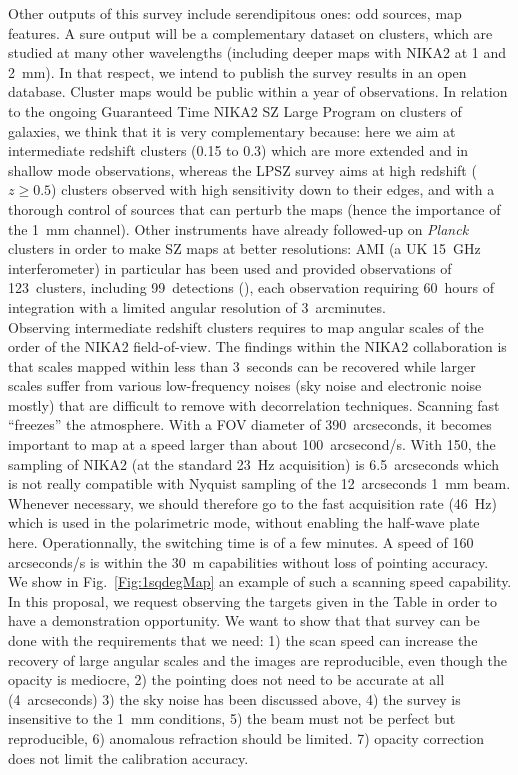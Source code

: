 \documentclass[11pt,a4paper,twoside,graphicx,color]{article}
\begin{document}
Other outputs of this survey include serendipitous ones: odd sources,
map features. A sure output will be a complementary dataset on
clusters, which are studied at many other wavelengths (including
deeper maps with NIKA2 at 1 and 2~mm). In that respect, we intend to
publish the survey results in an open database. Cluster maps would be
public within a year of observations. In relation to the ongoing
Guaranteed Time NIKA2 SZ Large Program on clusters of galaxies, we
think that it is very complementary because: here we aim at
intermediate redshift clusters (0.15 to 0.3) which are more extended
and in shallow mode observations, whereas the LPSZ survey aims at high
redshift ($z\ge 0.5$) clusters observed with high sensitivity down to
their edges, and with a thorough control of sources that can perturb
the maps (hence the importance of the 1~mm channel). Other instruments
have already followed-up on {\sl Planck} clusters in order to make SZ
maps at better resolutions: AMI (a UK 15~GHz interferometer) in
particular has been used and provided observations of 123~clusters,
including 99~detections (\cite{Perrott2015}), each observation
requiring 60~hours of integration with a limited angular resolution of
3~arcminutes.\\

\vspace{-0.1cm}  Observing intermediate redshift clusters requires to map
angular scales of the order of the NIKA2 field-of-view. The findings
within the NIKA2 collaboration is that scales mapped within less than
3~seconds can be recovered while larger scales suffer from various
low-frequency noises (sky noise and electronic noise mostly) that are
difficult to remove with decorrelation techniques. Scanning fast
``freezes'' the atmosphere. With a FOV diameter of 390~arcseconds, it
becomes important to map at a speed larger than about
100~arcsecond/s. With 150, the sampling of NIKA2 (at the standard
23~Hz acquisition) is 6.5~arcseconds which is not really compatible
with Nyquist sampling of the 12~arcseconds 1~mm beam. Whenever
necessary, we should therefore go to the fast acquisition rate (46~Hz)
which is used in the polarimetric mode, without enabling the half-wave
plate here. Operationnally, the switching time is of a few minutes. A
speed of 160 arcseconds/s is within the 30~m capabilities without loss
of pointing accuracy. We show in Fig.~\ref{Fig:1sqdegMap} an example
of such a scanning speed capability. In this proposal, we request
observing the targets given in the Table in order to have a
demonstration opportunity. We want to show that that survey can be
done with the requirements that we need: 1) the scan speed can
increase the recovery of large angular scales and the images are
reproducible, even though the opacity is mediocre, 2) the pointing
does not need to be accurate at all (4~arcseconds) 3) the sky noise
has been discussed above, 4) the survey is insensitive to the 1~mm
conditions, 5) the beam must not be perfect but reproducible, 6)
anomalous refraction should be limited. 7) opacity correction does not
limit the calibration accuracy.\\
\end{document}
